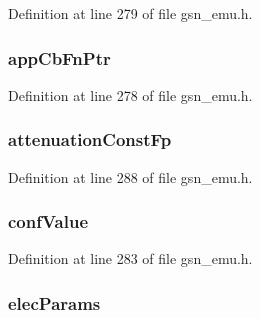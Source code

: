 Definition at line 279 of file gsn\_\-emu.h.

\hypertarget{a00059_a8a951fbafe874586d5d1a95ac1bda95e}{
\subsubsection[{appCbFnPtr}]{ {\bf appCbFnPtr}}}
\label{a00059_a8a951fbafe874586d5d1a95ac1bda95e}


Definition at line 278 of file gsn\_\-emu.h.

\hypertarget{a00059_aa8c6b643ee8938831977aa4738b52955}{
\subsubsection[{attenuationConstFp}]{ {\bf attenuationConstFp}}}
\label{a00059_aa8c6b643ee8938831977aa4738b52955}


Definition at line 288 of file gsn\_\-emu.h.

\hypertarget{a00059_a836176d32d447038bb88414b377b0695}{
\subsubsection[{confValue}]{ {\bf confValue}}}
\label{a00059_a836176d32d447038bb88414b377b0695}


Definition at line 283 of file gsn\_\-emu.h.

\hypertarget{a00059_ad4623a728b040b714e8b17d138d2e774}{
\subsubsection[{elecParams}]{ {\bf elecParams}}}
\label{a00059_ad4623a728b040b714e8b17d138d2e774}



